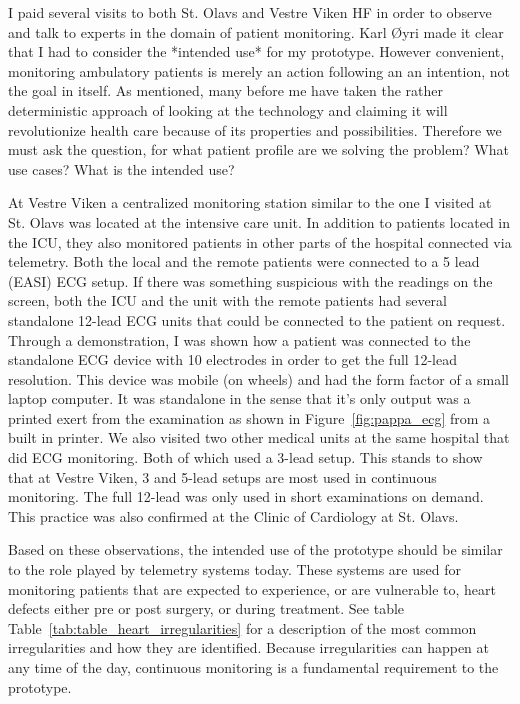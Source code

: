 I paid several visits to both St. Olavs and Vestre Viken HF in order to observe and talk to experts in the domain of patient monitoring. Karl Øyri made it clear that I had to consider the *intended use* for my prototype. However convenient, monitoring ambulatory patients is merely an action following an an intention, not the goal in itself. As mentioned, many before me have taken the rather deterministic approach of looking at the technology and claiming it will revolutionize health care because of its properties and possibilities. Therefore we must ask the question, for what patient profile are we solving the problem? What use cases? What is the intended use?

At Vestre Viken a centralized monitoring station similar to the one I visited at St. Olavs was located at the intensive care unit. In addition to patients located in the ICU, they also monitored patients in other parts of the hospital connected via telemetry. Both the local and the remote patients were connected to a 5 lead (EASI) ECG setup. If there was something suspicious with the readings on the screen, both the ICU and the unit with the remote patients had several standalone 12-lead ECG units that could be connected to the patient on request. Through a demonstration, I was shown how a patient was connected to the standalone ECG device with 10 electrodes in order to get the full 12-lead resolution. This device was mobile (on wheels) and had the form factor of a small laptop computer. It was standalone in the sense that it's only output was a printed exert from the examination as shown in Figure~\ref{fig:pappa_ecg} from a built in printer. We also visited two other medical units at the same hospital that did ECG monitoring. Both of which used a 3-lead setup. This stands to show that at Vestre Viken, 3 and 5-lead setups are most used in continuous monitoring. The full 12-lead was only used in short examinations on demand. This practice was also confirmed at the Clinic of Cardiology at St. Olavs.


Based on these observations, the intended use of the prototype should be similar to the role played by telemetry systems today. These systems are used for monitoring patients that are expected to experience, or are vulnerable to, heart defects either pre or post surgery, or during treatment. See table Table~\ref{tab:table_heart_irregularities} for a description of the most common irregularities and how they are identified. Because irregularities can happen at any time of the day, continuous monitoring is a fundamental requirement to the prototype.

